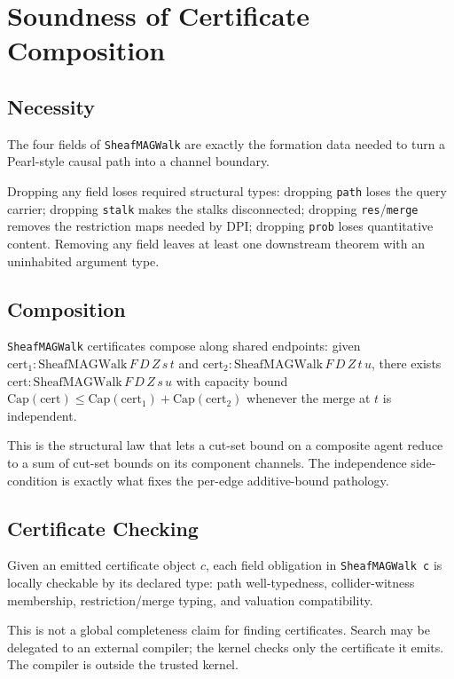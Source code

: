 \documentclass[acmsmall,screen,nonacm]{acmart}
\newcommand{\lean}[1]{\lstinline!#1!}
\begin{document}
\section{Soundness of Certificate Composition}\label{sec:soundness}

\subsection{Necessity}
\begin{theorem}[Necessity]
The four fields of \lean{SheafMAGWalk} are exactly the formation data needed to turn a Pearl-style causal path into a channel boundary.
\end{theorem}
Dropping any field loses required structural types: dropping \lean{path} loses the query carrier; dropping \lean{stalk} makes the stalks disconnected; dropping \lean{res}/\lean{merge} removes the restriction maps needed by DPI; dropping \lean{prob} loses quantitative content. Removing any field leaves at least one downstream theorem with an uninhabited argument type.

\subsection{Composition}
\begin{theorem}[Composition]
\lean{SheafMAGWalk} certificates compose along shared endpoints:
given $\text{cert}_1 : \text{SheafMAGWalk}\,F\,D\,Z\,s\,t$
and $\text{cert}_2 : \text{SheafMAGWalk}\,F\,D\,Z\,t\,u$,
there exists $\text{cert} : \text{SheafMAGWalk}\,F\,D\,Z\,s\,u$
with capacity bound $\text{Cap}(\text{cert}) \le \text{Cap}(\text{cert}_1) + \text{Cap}(\text{cert}_2)$
whenever the merge at $t$ is independent.
\end{theorem}
This is the structural law that lets a cut-set bound on a composite agent reduce to a sum of cut-set bounds on its component channels. The independence side-condition is exactly what fixes the per-edge additive-bound pathology.

\subsection{Certificate Checking}
\begin{theorem}
Given an emitted certificate object $c$, each field obligation in \lean{SheafMAGWalk c} is locally checkable by its declared type: path well-typedness, collider-witness membership, restriction/merge typing, and valuation compatibility.
\end{theorem}
This is not a global completeness claim for finding certificates. Search may be delegated to an external compiler; the kernel checks only the certificate it emits. The compiler is outside the trusted kernel.
\end{document}
